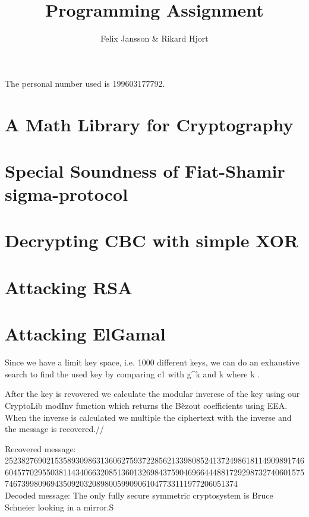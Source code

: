 \documentclass{article}
\author{Felix Jansson \& Rikard Hjort}
\title{Programming Assignment}
\begin{document}
The personal number used is 199603177792.

\section{A Math Library for Cryptography}

\section{Special Soundness of Fiat-Shamir sigma-protocol}

\section{Decrypting CBC with simple XOR}

\section{Attacking RSA}

\section{Attacking ElGamal}
Since we have a limit key space, i.e. 1000 different keys,  we can do an exhaustive search to find the used key by comparing c1 with g^k and k where k .

After the key is revovered we calculate the modular inverese of the key using our CryptoLib modInv function which returns the Bèzout coefficients using EEA.
When the inverse is calculated we multiple the ciphertext with the inverse and the message is recovered.//

Recovered message: 25238276902153589309863136062759372285621339808524137249861811490989174660457702955038114340663208513601326984375904696644488172929873274060157574673998096943509203208980059909061047733111977206051374 \\
Decoded message: The only fully secure symmetric cryptosystem is Bruce Schneier looking in a mirror.S       
\end{document}
